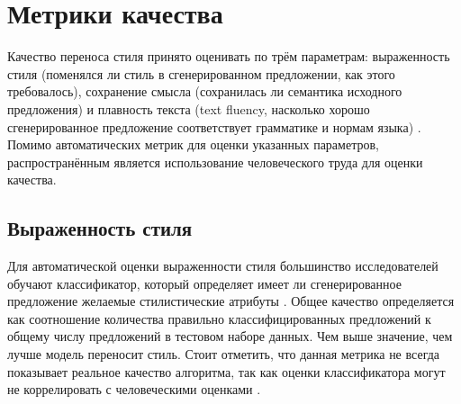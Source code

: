 \section{Метрики качества} \label{cha:analysis:sec:metrics}
Качество переноса стиля принято оценивать по трём параметрам:
выраженность стиля (поменялся ли стиль в сгенерированном предложении, как этого требовалось),
сохранение смысла (сохранилась ли семантика исходного предложения) и плавность текста (text fluency, насколько хорошо сгенерированное предложение соответствует грамматике и нормам языка) \cite{briakou2021evaluating}.
Помимо автоматических метрик для оценки указанных параметров, распространённым является использование человеческого труда для оценки качества.

\subsection{Выраженность стиля}
Для автоматической оценки выраженности стиля большинство исследователей обучают классификатор, который определяет имеет ли сгенерированное предложение желаемые стилистические атрибуты \cite{jin2021deep}.
Общее качество определяется как соотношение количества правильно классифицированных предложений к общему числу предложений в тестовом наборе данных. Чем выше значение, чем лучше модель переносит стиль. 
Стоит отметить, что данная метрика не всегда показывает реальное качество алгоритма, так как оценки классификатора могут не коррелировать с человеческими оценками \cite{li2018delete}.

